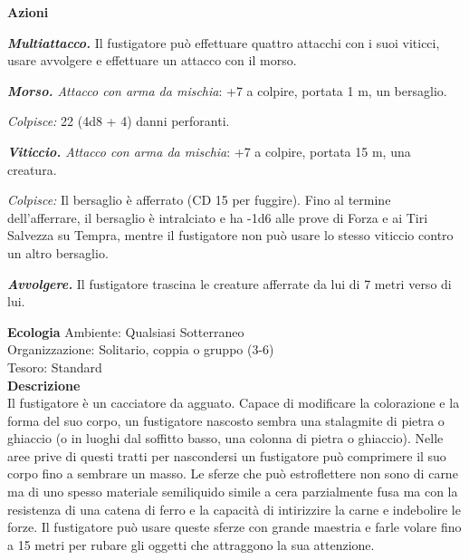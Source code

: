 \begin{multicols}{2}
\textbf{Azioni}

\emph{\textbf{Multiattacco.}} Il fustigatore può effettuare quattro attacchi con i suoi viticci, usare avvolgere e effettuare un attacco con il morso.

\emph{\textbf{Morso.} Attacco con arma da mischia}: +7 a colpire, portata 1 m, un bersaglio.

\emph{Colpisce:} 22 (4d8 + 4) danni perforanti.

\emph{\textbf{Viticcio.} Attacco con arma da mischia}: +7 a colpire, portata 15 m, una creatura.

\emph{Colpisce:} Il bersaglio è afferrato (CD 15 per fuggire). Fino al termine dell'afferrare, il bersaglio è intralciato e ha -1d6 alle prove di Forza e ai Tiri Salvezza su Tempra, mentre il fustigatore non può usare lo stesso viticcio contro un altro bersaglio.

\emph{\textbf{Avvolgere.}} Il fustigatore trascina le creature afferrate da lui di 7 metri verso di lui.

\textbf{Ecologia}
Ambiente: Qualsiasi Sotterraneo\\
Organizzazione: Solitario, coppia o gruppo (3-6)\\
Tesoro: Standard\\
\textbf{Descrizione}\\
Il fustigatore è un cacciatore da agguato. Capace di modificare la colorazione e la forma del suo corpo, un fustigatore nascosto sembra una stalagmite di pietra o ghiaccio (o in luoghi dal soffitto basso, una colonna di pietra o ghiaccio). Nelle aree prive di questi tratti per nascondersi un fustigatore può comprimere il suo corpo fino a sembrare un masso. Le sferze che può estroflettere non sono di carne ma di uno spesso materiale semiliquido simile a cera parzialmente fusa ma con la resistenza di una catena di ferro e la capacità di intirizzire la carne e indebolire le forze. Il fustigatore può usare queste sferze con grande maestria e farle volare fino a 15 metri per rubare gli oggetti che attraggono la sua attenzione.\\


\end{multicols}
